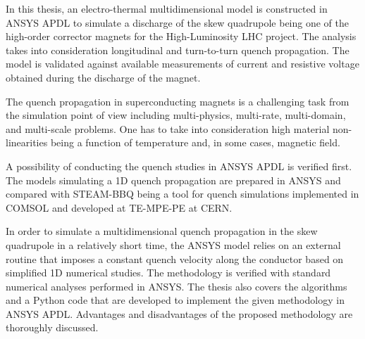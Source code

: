 
In this thesis, an electro-thermal multidimensional model is constructed in ANSYS APDL to simulate a discharge of the skew quadrupole being one of the high-order corrector magnets for the High-Luminosity LHC project. The analysis takes into consideration longitudinal and turn-to-turn quench propagation. The model is validated against available measurements of current and resistive voltage obtained during the discharge of the magnet. 

The quench propagation in superconducting magnets is a challenging task from the simulation point of view including multi-physics, multi-rate, multi-domain, and multi-scale problems. One has to take into consideration high material non-linearities being a function of temperature and, in some cases, magnetic field. 

A possibility of conducting the quench studies in ANSYS APDL is verified first. The models simulating a 1D quench propagation are prepared in ANSYS and compared with STEAM-BBQ being a tool for quench simulations implemented in COMSOL and developed at TE-MPE-PE at CERN. 

In order to simulate a multidimensional quench propagation in the skew quadrupole in a relatively short time, the ANSYS model relies on an external routine that imposes a constant quench velocity along the conductor based on simplified 1D numerical studies. The methodology is verified with standard numerical analyses performed in ANSYS. The thesis also covers the algorithms and a Python code that are developed to implement the given methodology in ANSYS APDL. Advantages and disadvantages of the proposed methodology are thoroughly discussed.